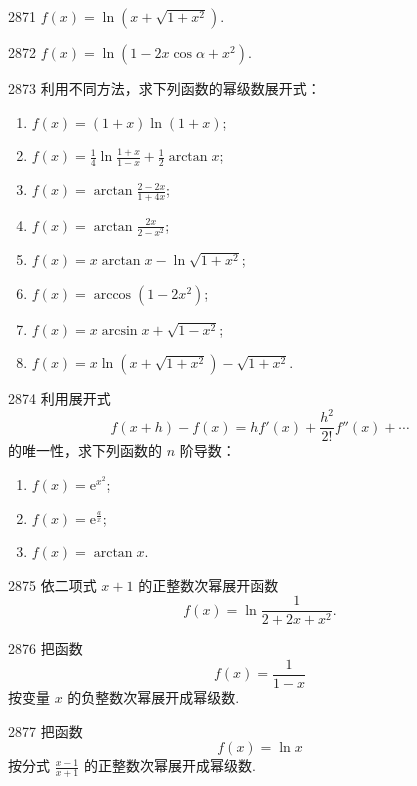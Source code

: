 \begin{prob}[S]{2871}
$f(x) = \ln\left(x + \sqrt{1+x^2}\right)$.
\end{prob}

\begin{prob}[S]{2872}
$f(x) = \ln\left(1 - 2x\cos\alpha + x^2\right)$.
\end{prob}

\begin{prob}[L]{2873}
利用不同方法，求下列函数的幂级数展开式：
\begin{enumerate}[label=(\alph*), itemsep=2pt, topsep=3pt]
\item $f(x) = (1+x)\ln(1+x)$;
\item $f(x) = \frac{1}{4}\ln\frac{1+x}{1-x} + \frac{1}{2}\arctan x$;
\item $f(x) = \arctan\frac{2-2x}{1+4x}$;
\item $f(x) = \arctan\frac{2x}{2-x^2}$;
\item $f(x) = x\arctan x - \ln\sqrt{1+x^2}$;
\item $f(x) = \arccos(1-2x^2)$;
\item $f(x) = x\arcsin x + \sqrt{1-x^2}$;
\item $f(x) = x\ln\left(x+\sqrt{1+x^2}\right) - \sqrt{1+x^2}$.
\end{enumerate}
\end{prob}

\begin{prob}[L]{2874}
利用展开式
\[
f(x+h) - f(x) = hf'(x) + \frac{h^2}{2!}f''(x) + \cdots
\]
的唯一性，求下列函数的 $n$ 阶导数：
\begin{enumerate}[label=(\alph*), itemsep=2pt, topsep=3pt]
\item $f(x) = \mathrm{e}^{x^2}$;
\item $f(x) = \mathrm{e}^{\frac{a}{x}}$;
\item $f(x) = \arctan x$.
\end{enumerate}
\end{prob}

\begin{prob}[S]{2875}
依二项式 $x+1$ 的正整数次幂展开函数
\[
f(x) = \ln\frac{1}{2+2x+x^2}.
\]
\end{prob}

\begin{prob}[S]{2876}
把函数
\[
f(x) = \frac{1}{1-x}
\]
按变量 $x$ 的负整数次幂展开成幂级数.
\end{prob}

\begin{prob}[S]{2877}
把函数
\[
f(x) = \ln x
\]
按分式 $\frac{x-1}{x+1}$ 的正整数次幂展开成幂级数.
\end{prob}

